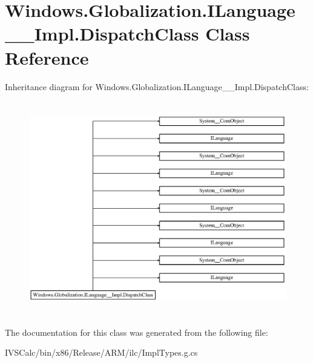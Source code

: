 \hypertarget{class_windows_1_1_globalization_1_1_i_language_____impl_1_1_dispatch_class}{}\section{Windows.\+Globalization.\+I\+Language\+\_\+\+\_\+\+Impl.\+Dispatch\+Class Class Reference}
\label{class_windows_1_1_globalization_1_1_i_language_____impl_1_1_dispatch_class}
Inheritance diagram for Windows.\+Globalization.\+I\+Language\+\_\+\+\_\+\+Impl.\+Dispatch\+Class\+:\begin{figure}[H]
\begin{center}
\leavevmode
\includegraphics[height=9.361702cm]{class_windows_1_1_globalization_1_1_i_language_____impl_1_1_dispatch_class}
\end{center}
\end{figure}


The documentation for this class was generated from the following file\+:\begin{DoxyCompactItemize}
\item 
I\+V\+S\+Calc/bin/x86/\+Release/\+A\+R\+M/ilc/Impl\+Types.\+g.\+cs\end{DoxyCompactItemize}

